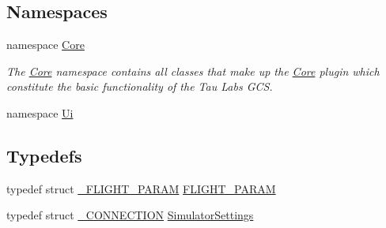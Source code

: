 \subsection*{\-Namespaces}
\begin{DoxyCompactItemize}
\item 
namespace \hyperlink{namespace_core}{\-Core}
\begin{DoxyCompactList}\small\item\em \-The \hyperlink{namespace_core}{\-Core} namespace contains all classes that make up the \hyperlink{namespace_core}{\-Core} plugin which constitute the basic functionality of the \-Tau \-Labs \-G\-C\-S. \end{DoxyCompactList}\item 
namespace \hyperlink{namespace_ui}{\-Ui}
\end{DoxyCompactItemize}
\subsection*{\-Typedefs}
\begin{DoxyCompactItemize}
\item 
typedef struct \hyperlink{struct___f_l_i_g_h_t___p_a_r_a_m}{\-\_\-\-F\-L\-I\-G\-H\-T\-\_\-\-P\-A\-R\-A\-M} \hyperlink{group___h_i_t_l_plugin_ga7bda7a22b899fe8dff0ba9a0cae99da6}{\-F\-L\-I\-G\-H\-T\-\_\-\-P\-A\-R\-A\-M}
\item 
typedef struct \hyperlink{struct___c_o_n_n_e_c_t_i_o_n}{\-\_\-\-C\-O\-N\-N\-E\-C\-T\-I\-O\-N} \hyperlink{group___h_i_t_l_plugin_ga052199f1328d3002bce3e45345aa7f4e}{\-Simulator\-Settings}
\end{DoxyCompactItemize}
